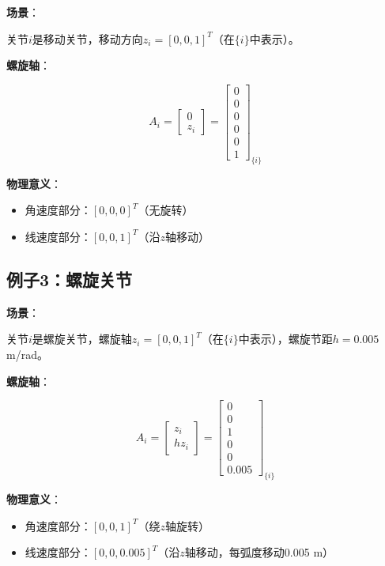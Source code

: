 \documentclass[12pt,a4paper]{article}
\begin{document}
\textbf{场景}：

关节$i$是移动关节，移动方向$z_i = [0, 0, 1]^T$（在$\{i\}$中表示）。

\textbf{螺旋轴}：

\begin{equation}
A_i = \begin{bmatrix} 0 \\ z_i \end{bmatrix} = \begin{bmatrix} 0 \\ 0 \\ 0 \\ 0 \\ 0 \\ 1 \end{bmatrix}_{\{i\}}
\end{equation}

\textbf{物理意义}：
\begin{itemize}
\item 角速度部分：$[0, 0, 0]^T$（无旋转）
\item 线速度部分：$[0, 0, 1]^T$（沿$z$轴移动）
\end{itemize}

\subsection{例子3：螺旋关节}

\textbf{场景}：

关节$i$是螺旋关节，螺旋轴$z_i = [0, 0, 1]^T$（在$\{i\}$中表示），螺旋节距$h = 0.005$ m/rad。

\textbf{螺旋轴}：

\begin{equation}
A_i = \begin{bmatrix} z_i \\ h z_i \end{bmatrix} = \begin{bmatrix} 0 \\ 0 \\ 1 \\ 0 \\ 0 \\ 0.005 \end{bmatrix}_{\{i\}}
\end{equation}

\textbf{物理意义}：
\begin{itemize}
\item 角速度部分：$[0, 0, 1]^T$（绕$z$轴旋转）
\item 线速度部分：$[0, 0, 0.005]^T$（沿$z$轴移动，每弧度移动0.005 m）
\end{itemize}
\end{document}
